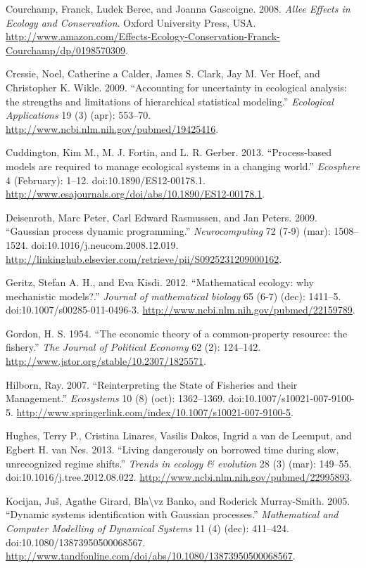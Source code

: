\documentclass[author-year, review]{elsarticle} %
\begin{document}
Courchamp, Franck, Ludek Berec, and Joanna Gascoigne. 2008. \emph{Allee
Effects in Ecology and Conservation}. Oxford University Press, USA.
\url{http://www.amazon.com/Effects-Ecology-Conservation-Franck-Courchamp/dp/0198570309}.

Cressie, Noel, Catherine a Calder, James S. Clark, Jay M. Ver Hoef, and
Christopher K. Wikle. 2009. ``Accounting for uncertainty in ecological
analysis: the strengths and limitations of hierarchical statistical
modeling.'' \emph{Ecological Applications} 19 (3) (apr): 553--70.
\url{http://www.ncbi.nlm.nih.gov/pubmed/19425416}.

Cuddington, Kim M., M. J. Fortin, and L. R. Gerber. 2013.
``Process-based models are required to manage ecological systems in a
changing world.'' \emph{Ecosphere} 4 (February): 1--12.
doi:10.1890/ES12-00178.1.
\url{http://www.esajournals.org/doi/abs/10.1890/ES12-00178.1}.

Deisenroth, Marc Peter, Carl Edward Rasmussen, and Jan Peters. 2009.
``Gaussian process dynamic programming.'' \emph{Neurocomputing} 72 (7-9)
(mar): 1508--1524. doi:10.1016/j.neucom.2008.12.019.
\url{http://linkinghub.elsevier.com/retrieve/pii/S0925231209000162}.

Geritz, Stefan A. H., and Eva Kisdi. 2012. ``Mathematical ecology: why
mechanistic models?.'' \emph{Journal of mathematical biology} 65 (6-7)
(dec): 1411--5. doi:10.1007/s00285-011-0496-3.
\url{http://www.ncbi.nlm.nih.gov/pubmed/22159789}.

Gordon, H. S. 1954. ``The economic theory of a common-property resource:
the fishery.'' \emph{The Journal of Political Economy} 62 (2): 124--142.
\url{http://www.jstor.org/stable/10.2307/1825571}.

Hilborn, Ray. 2007. ``Reinterpreting the State of Fisheries and their
Management.'' \emph{Ecosystems} 10 (8) (oct): 1362--1369.
doi:10.1007/s10021-007-9100-5.
\url{http://www.springerlink.com/index/10.1007/s10021-007-9100-5}.

Hughes, Terry P., Cristina Linares, Vasilis Dakos, Ingrid a van de
Leemput, and Egbert H. van Nes. 2013. ``Living dangerously on borrowed
time during slow, unrecognized regime shifts.'' \emph{Trends in ecology
\& evolution} 28 (3) (mar): 149--55. doi:10.1016/j.tree.2012.08.022.
\url{http://www.ncbi.nlm.nih.gov/pubmed/22995893}.

Kocijan, Juš, Agathe Girard, Bla\textbackslash{}vz Banko, and Roderick
Murray-Smith. 2005. ``Dynamic systems identification with Gaussian
processes.'' \emph{Mathematical and Computer Modelling of Dynamical
Systems} 11 (4) (dec): 411--424. doi:10.1080/13873950500068567.
\url{http://www.tandfonline.com/doi/abs/10.1080/13873950500068567}.
\end{document}
